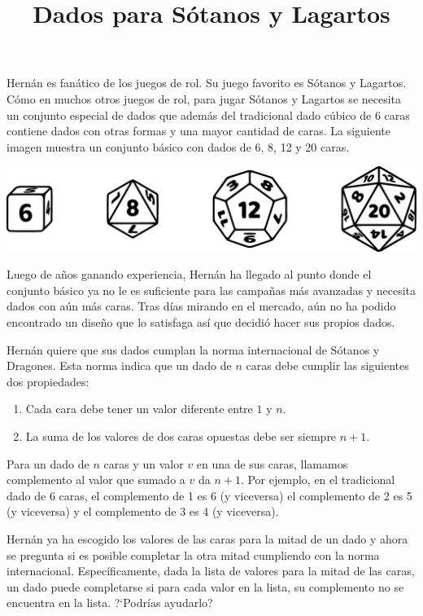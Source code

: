 \documentclass{oci}
\title{Dados para Sótanos y Lagartos}
\begin{document}
\begin{problemDescription}
  Hernán es fanático de los juegos de rol.
  Su juego favorito es Sótanos y Lagartos.
  Cómo en muchos otros juegos de rol, para jugar Sótanos y Lagartos se
  necesita un conjunto especial de dados que además del tradicional
  dado cúbico de 6 caras contiene dados con otras formas y una mayor
  cantidad de caras.
  La siguiente imagen muestra un conjunto básico con dados de
  6, 8, 12 y 20 caras.
  \begin{center}
    \includegraphics[scale=0.2]{horizontal-sin4}
  \end{center}

  Luego de años ganando experiencia, Hernán ha llegado al
  punto donde el conjunto básico ya no le es suficiente para
  las campañas más avanzadas y necesita dados con aún más caras.
  Tras días mirando en el mercado, aún no ha podido encontrado
  un diseño que lo satisfaga así que decidió hacer sus propios
  dados.

  Hernán quiere que sus dados cumplan la norma internacional
  de Sótanos y Dragones.
  Esta norma indica que un dado de $n$ caras debe cumplir las
  siguientes dos propiedades:
  \begin{enumerate}
    \item Cada cara debe tener un valor diferente entre $1$ y $n$.
    \item La suma de los valores de dos caras opuestas debe ser siempre $n+1$.
  \end{enumerate}
  Para un dado de $n$ caras y un valor $v$ en una de sus caras, llamamos
  complemento al valor que sumado a $v$ da $n+1$.
  Por ejemplo, en el tradicional dado de 6 caras, el complemento de 1 es 6 (y viceversa)
  el complemento de 2 es 5 (y viceversa) y el complemento de 3 es 4 (y viceversa).

  Hernán ya ha escogido los valores de las caras para la mitad de un dado y
  ahora se pregunta si es posible completar la otra mitad cumpliendo con la norma
  internacional.
  Específicamente, dada la lista de valores para la mitad de las caras, un
  dado puede completarse si para cada valor en la lista, su complemento no se
  encuentra en la lista.
  ?`Podrías ayudarlo?
\end{problemDescription}
\end{document}
